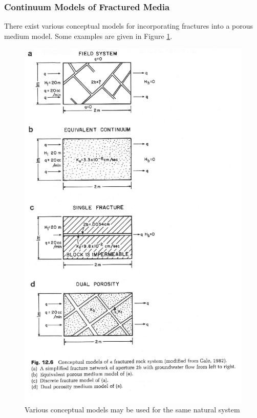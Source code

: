 \subsubsection{Continuum Models of Fractured Media} 

There exist various conceptual models for incorporating fractures into a porous  
medium model. Some examples are given in Figure \ref{fig:fractureModels}.

\begin{figure}[htbp!]
  \begin{center}
    \includegraphics{./litrev/fractureModels.eps}
  \end{center}
  \caption{Various conceptual models may be used for the same natural system 
  \cite{anderson_applied_1992}}
  \label{fig:fractureModels}
\end{figure}



